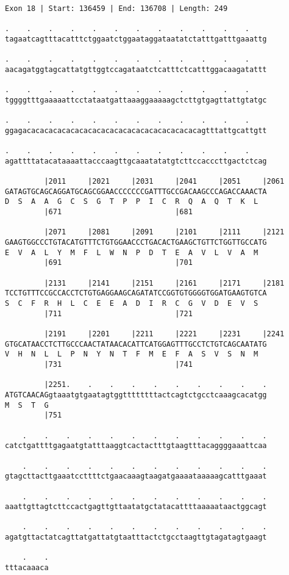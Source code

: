 \documentclass{article}
\begin{document}
\newpage
\begin{Verbatim}
Exon 18 | Start: 136459 | End: 136708 | Length: 249
 
.    .    .    .    .    .    .    .    .    .    .    .    
tagaatcagtttacatttctggaatctggaataggataatatctatttgatttgaaattg
  
.    .    .    .    .    .    .    .    .    .    .    .    
aacagatggtagcattatgttggtccagataatctcatttctcatttggacaagatattt
  
.    .    .    .    .    .    .    .    .    .    .    .    
tggggtttgaaaaattcctataatgattaaaggaaaaagctcttgtgagttattgtatgc
  
.    .    .    .    .    .    .    .    .    .    .    .    
ggagacacacacacacacacacacacacacacacacacacacacagtttattgcattgtt
  
.    .    .    .    .    .    .    .    .    .    .    .    
agattttatacataaaattacccaagttgcaaatatatgtcttccacccttgactctcag
  
         |2011     |2021     |2031     |2041     |2051     |2061
GATAGTGCAGCAGGATGCAGCGGAACCCCCCCGATTTGCCGACAAGCCCAGACCAAACTA
D  S  A  A  G  C  S  G  T  P  P  I  C  R  Q  A  Q  T  K  L  
         |671                          |681                 
  
         |2071     |2081     |2091     |2101     |2111     |2121
GAAGTGGCCCTGTACATGTTTCTGTGGAACCCTGACACTGAAGCTGTTCTGGTTGCCATG
E  V  A  L  Y  M  F  L  W  N  P  D  T  E  A  V  L  V  A  M  
         |691                          |701                 
  
         |2131     |2141     |2151     |2161     |2171     |2181
TCCTGTTTCCGCCACCTCTGTGAGGAAGCAGATATCCGGTGTGGGGTGGATGAAGTGTCA
S  C  F  R  H  L  C  E  E  A  D  I  R  C  G  V  D  E  V  S  
         |711                          |721                 
  
         |2191     |2201     |2211     |2221     |2231     |2241
GTGCATAACCTCTTGCCCAACTATAACACATTCATGGAGTTTGCCTCTGTCAGCAATATG
V  H  N  L  L  P  N  Y  N  T  F  M  E  F  A  S  V  S  N  M  
         |731                          |741                 
  
         |2251.    .    .    .    .    .    .    .    .    .
ATGTCAACAGgtaaatgtgaatagtggttttttttactcagtctgcctcaaagcacatgg
M  S  T  G                                                  
         |751                                               
  
    .    .    .    .    .    .    .    .    .    .    .    .
catctgattttgagaatgtatttaaggtcactactttgtaagtttacaggggaaattcaa
  
    .    .    .    .    .    .    .    .    .    .    .    .
gtagcttacttgaaatccttttctgaacaaagtaagatgaaaataaaaagcatttgaaat
  
    .    .    .    .    .    .    .    .    .    .    .    .
aaattgttagtcttccactgagttgttaatatgctatacattttaaaaataactggcagt
  
    .    .    .    .    .    .    .    .    .    .    .    .
agatgttactatcagttatgattatgtaatttactctgcctaagttgtagatagtgaagt
  
    .    .
tttacaaaca
\end{Verbatim}
\end{document}
